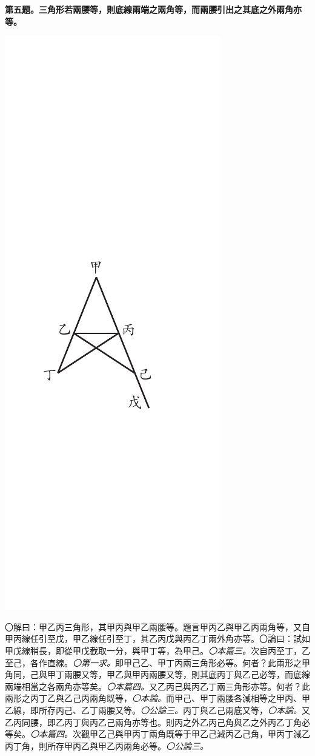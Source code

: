 \documentclass[12pt,b5paper,landscape]{article}
\newcommand{\ccom}[1]{{\footnotesize \emph{〇#1}}}
\newcommand{\bcom}[1]{〇#1}
\newcommand{\cthm}[1]{{
\vspace{8pt}

\bfseries #1}}
\begin{document}
\begin{multicols}{2}
\cthm{第五題。三角形若兩腰等，則底線兩端之兩角等，而兩腰引出之其底之外兩角亦等。}
\begin{center}
\includegraphics[angle=90]{eu39}
\end{center}
\bcom{解曰：甲乙丙三角形，其甲丙與甲乙兩腰等。題言甲丙乙與甲乙丙兩角等，又自甲丙線任引至戊，甲乙線任引至丁，其乙丙戊與丙乙丁兩外角亦等。}\bcom{論曰：試如甲戊線稍長，即從甲戊截取一分，與甲丁等，為甲己。\ccom{本篇三。}次自丙至丁，乙至己，各作直線。\ccom{第一求。}即甲己乙、甲丁丙兩三角形必等。何者？此兩形之甲角同，己與甲丁兩腰又等，甲乙與甲丙兩腰又等，則其底丙丁與乙己必等，而底線兩端相當之各兩角亦等矣。\ccom{本篇四。}又乙丙己與丙乙丁兩三角形亦等。何者？此兩形之丙丁乙與乙己丙兩角既等，\ccom{本論。}而甲己、甲丁兩腰各減相等之甲丙、甲乙線，即所存丙己、乙丁兩腰又等。\ccom{公論三。}丙丁與乙己兩底又等，\ccom{本論。}又乙丙同腰，即乙丙丁與丙乙己兩角亦等也。則丙之外乙丙己角與乙之外丙乙丁角必等矣。\ccom{本篇四。}次觀甲乙己與甲丙丁兩角既等于甲乙己減丙乙己角，甲丙丁減乙丙丁角，則所存甲丙乙與甲乙丙兩角必等。\ccom{公論三。}}

\end{multicols}
\end{document}

